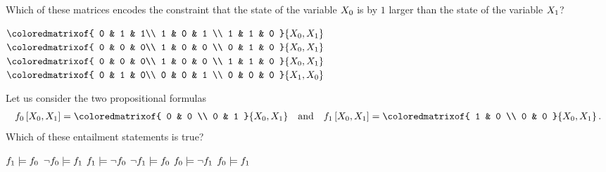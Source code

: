 \documentclass[answers,12pt]{exam}
\begin{document}
\begin{questions}
        \question
        Which of these matrices encodes the constraint that the state of the variable $X_{0}$ is by $1$ larger than the state of the variable $X_{1}$? \\
        \begin{oneparcheckboxes}
            \choice
            $\coloredmatrixof{
                0 & 1 & 1\\
                1 & 0 & 1 \\
                1 & 1 & 0
            }{\catvariableof{0},\catvariableof{1}}$
            \correctchoice
            {$\coloredmatrixof{
                0 & 0 & 0\\
                1 & 0 & 0 \\
                0 & 1 & 0
            }{\catvariableof{0},\catvariableof{1}}$}\\
            \choice
            $\coloredmatrixof{
                0 & 0 & 0\\
                1 & 0 & 0 \\
                1 & 1 & 0
            }{\catvariableof{0},\catvariableof{1}}$
            \correctchoice
            $\coloredmatrixof{
                0 & 1 & 0\\
                0 & 0 & 1 \\
                0 & 0 & 0
            }{\catvariableof{1},\catvariableof{0}}$
        \end{oneparcheckboxes}

        \question Let us consider the two propositional formulas
        \begin{align*}
            \formulaofat{0}{\catvariableof{0},\catvariableof{1}}
            =
            \coloredmatrixof{
                0 & 0 \\
                0 & 1
            }{\catvariableof{0},\catvariableof{1}}
            \quad \text{and} \quad
            \formulaofat{1}{\catvariableof{0},\catvariableof{1}}
            =
            \coloredmatrixof{
                1 & 0 \\
                0 & 0
            }{\catvariableof{0},\catvariableof{1}} \, .
        \end{align*}
        Which of these entailment statements is true? \\
        \begin{oneparcheckboxes}
            \choice $f_{1}\models f_{0}$
            \choice $\lnot f_{0}\models f_{1}$
            \correctchoice $f_{1}\models\lnot f_{0}$
            \choice $\lnot f_{1}\models f_{0}$
            \correctchoice $f_{0}\models\lnot f_{1}$
            \choice $f_{0}\models f_{1}$
        \end{oneparcheckboxes}


\end{questions}
\end{document}

